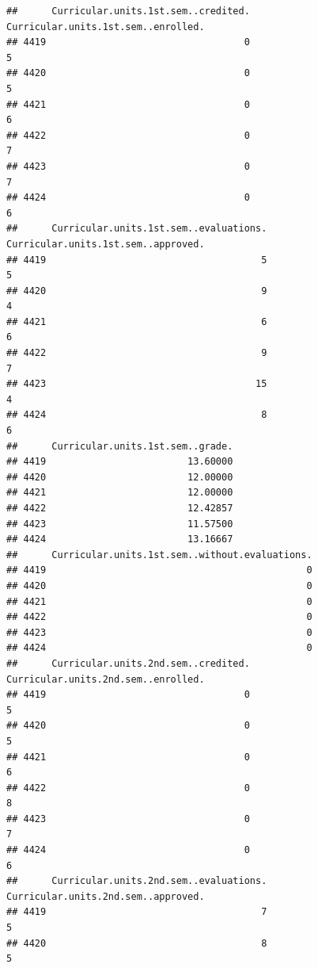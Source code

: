 \documentclass[
]{article}
\begin{document}
\begin{verbatim}
##      Curricular.units.1st.sem..credited. Curricular.units.1st.sem..enrolled.
## 4419                                   0                                   5
## 4420                                   0                                   5
## 4421                                   0                                   6
## 4422                                   0                                   7
## 4423                                   0                                   7
## 4424                                   0                                   6
##      Curricular.units.1st.sem..evaluations. Curricular.units.1st.sem..approved.
## 4419                                      5                                   5
## 4420                                      9                                   4
## 4421                                      6                                   6
## 4422                                      9                                   7
## 4423                                     15                                   4
## 4424                                      8                                   6
##      Curricular.units.1st.sem..grade.
## 4419                         13.60000
## 4420                         12.00000
## 4421                         12.00000
## 4422                         12.42857
## 4423                         11.57500
## 4424                         13.16667
##      Curricular.units.1st.sem..without.evaluations.
## 4419                                              0
## 4420                                              0
## 4421                                              0
## 4422                                              0
## 4423                                              0
## 4424                                              0
##      Curricular.units.2nd.sem..credited. Curricular.units.2nd.sem..enrolled.
## 4419                                   0                                   5
## 4420                                   0                                   5
## 4421                                   0                                   6
## 4422                                   0                                   8
## 4423                                   0                                   7
## 4424                                   0                                   6
##      Curricular.units.2nd.sem..evaluations. Curricular.units.2nd.sem..approved.
## 4419                                      7                                   5
## 4420                                      8                                   5

\end{verbatim}
\end{document}
